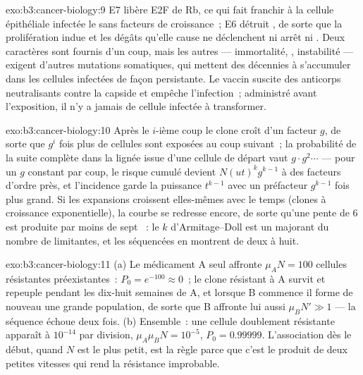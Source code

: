 \begin{solution}{exo:b3:cancer-biology:9}
E7 libère E2F de Rb, ce qui fait franchir à la cellule épithéliale
infectée le  sans facteurs de croissance~; E6
détruit , de sorte que la prolifération indue et les dégâts qu'elle
cause ne déclenchent ni arrêt ni . Deux caractères sont fournis
d'un coup, mais les autres --- immortalité, , instabilité ---
exigent d'autres mutations somatiques, qui mettent des décennies à
s'accumuler dans les cellules infectées de façon persistante. Le vaccin
suscite des anticorps neutralisants contre la capside et empêche
l'infection~; administré avant l'exposition, il n'y a jamais de cellule
infectée à transformer.
\end{solution}

\begin{solution}{exo:b3:cancer-biology:10}
Après le $i$-ième coup le clone croît d'un facteur $g$, de sorte que
$g^{i}$ fois plus de cellules sont exposées au coup suivant~; la
probabilité de la suite complète dans la lignée issue d'une cellule de
départ vaut $g\cdot g^{2}\cdots$ --- pour un $g$ constant par coup, le
risque cumulé devient $N(ut)^{k}
g^{k-1}$ à des facteurs d'ordre près, et l'incidence garde la puissance
$t^{k-1}$ avec un préfacteur $g^{k-1}$ fois plus grand. Si les
expansions croissent elles-mêmes avec le temps (clones à croissance
exponentielle), la courbe se redresse encore, de sorte qu'une pente de
$6$ est produite par moins de sept ~: le $k$
d'Armitage--Doll est un majorant du nombre de 
limitantes, et les  séquencées en montrent de deux à huit.
\end{solution}

\begin{solution}{exo:b3:cancer-biology:11}
(a) Le médicament A seul affronte $\mu_{A}N = 100$ cellules résistantes
préexistantes~: $P_{0} = e^{-100} \approx 0$~; le clone résistant à A
survit et repeuple pendant les dix-huit semaines de A, et lorsque B
commence il forme de nouveau une grande population, de sorte que B
affronte lui aussi $\mu_{B}N' \gg 1$ --- la séquence échoue deux fois.
(b) Ensemble~: une cellule doublement résistante apparaît à $10^{-14}$
par division, $\mu_{A}\mu_{B}N = 10^{-5}$, $P_{0} =
0.99999$. L'association dès le début, quand $N$ est le plus petit, est
la règle parce que c'est le produit de deux petites vitesses qui rend
la résistance improbable.
\end{solution}

